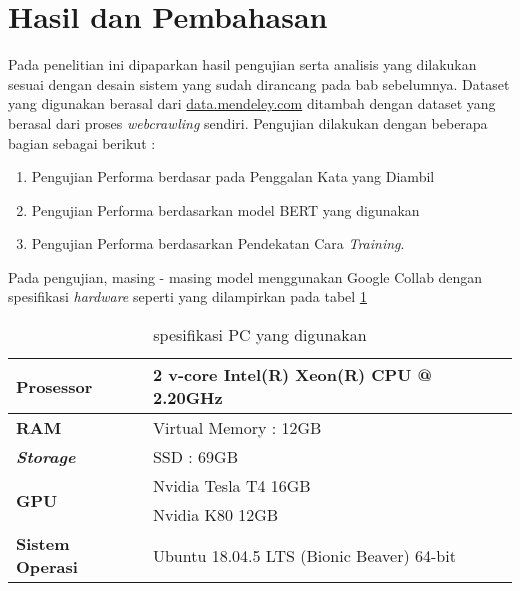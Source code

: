 \section{Hasil dan Pembahasan}
\label{sec:hasilpembahasan}

Pada penelitian ini dipaparkan hasil pengujian serta analisis yang dilakukan sesuai dengan desain sistem yang sudah dirancang pada bab sebelumnya. Dataset yang digunakan berasal dari \url{data.mendeley.com} ditambah dengan dataset yang berasal dari proses \textit{webcrawling} sendiri. Pengujian dilakukan dengan beberapa bagian sebagai berikut :

\begin{enumerate}[nolistsep]
    \item Pengujian Performa berdasar pada Penggalan Kata yang Diambil
    \item Pengujian Performa berdasarkan model BERT yang digunakan
    \item Pengujian Performa berdasarkan Pendekatan Cara \textit{Training}.
\end{enumerate}

Pada pengujian, masing - masing model menggunakan Google Collab dengan spesifikasi \textit{hardware} seperti yang dilampirkan pada tabel \ref{tab:specs_collab}

\begin{table}[h]
    \caption{spesifikasi PC yang digunakan}
    \label{tab:specs_collab}
    \centering
    \begin{tabular}{|l|l|}
        \hline
        \textbf{Prosessor}            & 2 v-core Intel(R) Xeon(R) CPU @ 2.20GHz   \\ \hline
        \textbf{RAM}                  & Virtual Memory : 12GB                     \\ \hline
        \textit{\textbf{Storage}}     & SSD : 69GB                                \\ \hline
        \multirow{2}{*}{\textbf{GPU}} & Nvidia Tesla T4 16GB                      \\ \cline{2-2}
                                      & Nvidia K80 12GB                           \\ \hline
        \textbf{Sistem Operasi}       & Ubuntu 18.04.5 LTS (Bionic Beaver) 64-bit \\ \hline
    \end{tabular}
\end{table}

